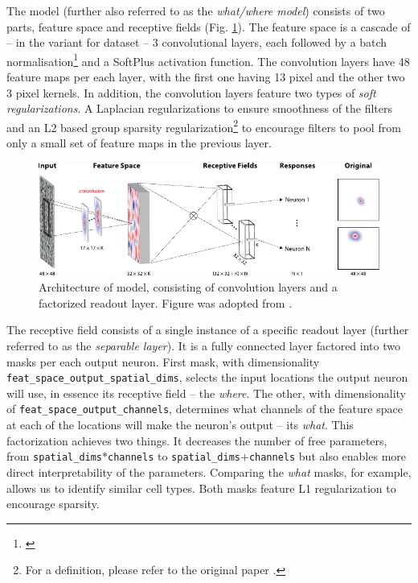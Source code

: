The model (further also referred to as the \textit{what/where model}) consists of two parts, feature space and receptive fields (Fig. \ref{fig:2.2}). The feature space is a cascade of -- in the variant for \citeauthor{antolik} dataset -- 3 convolutional layers, each followed by a batch normalisation\footnote{\citep{2015arXiv150203167I}} and a SoftPlus activation function. The convolution layers have 48 feature maps per each layer, with the first one having 13 pixel and the other two 3 pixel kernels. In addition, the convolution layers feature two types of \textit{soft regularizations}. A Laplacian regularizations to ensure smoothness of the filters and an L2 based group sparsity regularization\footnote{For a definition, please refer to the original paper \citep{klindt}.} to encourage filters to pool from only a small set of feature maps in the previous layer.

\begin{figure}[h]
    \centering
    \includegraphics[width=1\textwidth]{../figures/02_fig2_A2u}
    \caption[klindt et al. model]{Architecture of \citeauthor{klindt} model, consisting of convolution layers and a factorized readout layer. Figure was adopted from \citep{klindt}.}
    \label{fig:2.2}
\end{figure}

The receptive field consists of a single instance of a specific readout layer (further referred to as the \textit{separable layer}). It is a fully connected layer factored into two masks per each output neuron. First mask, with dimensionality \texttt{feat\_space\_output\_spatial\_dims}, selects the input locations the output neuron will use, in essence its receptive field -- the \textit{where}. The other, with dimensionality of \texttt{feat\_space\_output\_channels}, determines what channels of the feature space at each of the locations will make the neuron’s output -- its \textit{what}. This factorization achieves two things. It decreases the number of free parameters, from \texttt{spatial\_dims}$*$\texttt{channels} to \texttt{spa\-tial\_dims}$+$\texttt{channels} but also enables more direct interpretability of the parameters. Comparing the \textit{what} masks, for example, allows us to identify similar cell types. Both masks feature L1 regularization to encourage sparsity.

